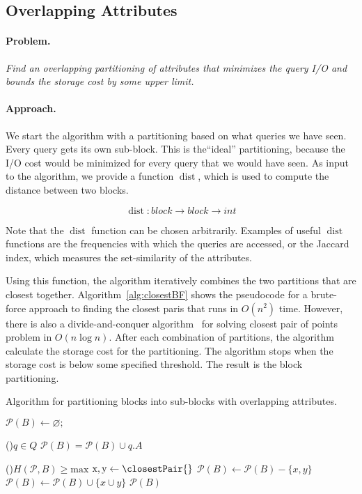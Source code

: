 \documentclass[twocolumn]{svjour3}          %
\let\emptyset\varnothing
\DeclareMathOperator{\dist}{dist}
\begin{document}
\subsection{Overlapping Attributes}

\paragraph*{Problem.}\emph{Find an overlapping partitioning of attributes that minimizes
  the query I/O and bounds the storage cost by some upper limit.}

\paragraph*{Approach.} We start the algorithm with a 
 partitioning based on what queries we have seen.
Every query gets its own sub-block. This is the``ideal'' partitioning,
because the I/O cost would be minimized for every query that we would
have seen. As input to the algorithm, we provide a function $\dist$, which
is used to compute the distance between two blocks.

$$
\dist: block \rightarrow block \rightarrow int
$$

Note that the $\dist$ function can be chosen arbitrarily.  Examples of useful
$\dist$ functions are the frequencies with which the queries are accessed, or the Jaccard index, which measures the set-similarity of
the attributes.

Using this function, the algorithm iteratively combines the two partitions that
are closest together. Algorithm~\ref{alg:closestBF} shows the pseudocode for a brute-force approach
  to finding the closest paris that runs in $O(n^2)$ time. However, there is
  also a divide-and-conquer algorithm~\cite{cormen01} for solving closest pair
  of points problem in $O(n \log n)$.
After each combination of partitions, the algorithm calculate the storage cost
for the partitioning. The algorithm stops when the  storage cost is below some
specified threshold.  The result is the block partitioning.



\begin{algorithm}[h]
\scriptsize
\caption{Algorithm for partitioning blocks into sub-blocks with overlapping attributes.}
\label{alg:overlappingP}
$\mathcal{P}(B) \leftarrow \emptyset;$  

\For(){$q \in Q$}{ 
 $\mathcal{P}(B) = \mathcal{P}(B) \cup q.A$ 
}

\While(){$H(\mathcal{P}, B) \geq
  \text{max}$}{
$\text{x}, \text{y}  \leftarrow  \closestPair{}  $\;
 $ \mathcal{P}(B)  \leftarrow \mathcal{P}(B) - \{x, y\}$ \;
  $\mathcal{P}(B)  \leftarrow \mathcal{P}(B)  \cup \{ x \cup y \}$ \;
}
\Return $ \mathcal{P}(B)$  
\end{algorithm} 
\end{document}
